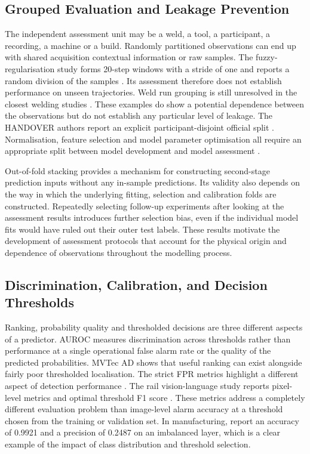 \subsection{Grouped Evaluation and Leakage Prevention}

The independent assessment unit may be a weld, a tool, a participant, a recording, a machine or a
build.
Randomly partitioned observations can end up with shared acquisition contextual information or raw
samples. The fuzzy-regularisation study forms 20-step windows with a stride of one and reports a random
division of the samples \parencite[Sections~IV.A--IV.B]{Altinses2023Fuzzy}.
Its assessment therefore does not establish performance on unseen trajectories.
Weld run grouping is still unresolved in the closest welding studies \parencite{P003,Hua2026Weld}. These
examples do show a potential dependence between the observations but do not establish any particular
level of leakage.
The HANDOVER authors report an explicit participant-disjoint official split \parencite{Thoduka2024Handover}.
Normalisation, feature selection and model parameter optimisation all require an appropriate split
between model development and model assessment \parencite{P004,P017}.

Out-of-fold stacking provides a mechanism for constructing second-stage prediction inputs without
any in-sample predictions. Its validity also depends on the way in which the
underlying fitting, selection and calibration folds are constructed.
Repeatedly selecting follow-up experiments after looking at the assessment results introduces
further selection bias, even if the individual model fits would have ruled out their outer test
labels.
These results motivate the development of assessment protocols that account for the physical origin
and dependence of observations throughout the modelling process.

\subsection{Discrimination, Calibration, and Decision Thresholds}

Ranking, probability quality and thresholded decisions are three different aspects of a predictor.
AUROC measures discrimination across thresholds rather than performance at a single operational
false alarm rate or the quality of the predicted probabilities.
MVTec AD shows that useful ranking can exist alongside fairly poor thresholded localisation. The
strict FPR metrics highlight a different aspect of detection performance
\parencite{Bergmann2019MVTec,Costanzino2024Multimodal,Cheng2025Multimodal}.
The rail vision-language study reports pixel-level metrics and optimal threshold F1 score \parencite[Section~IV.B.2]{P031}. These metrics address a completely different evaluation problem than image-level alarm
accuracy at a threshold chosen from the training or validation set.
In manufacturing, \textcite{Petrich2021Multimodal} report an accuracy of 0.9921 and a precision of 0.2487 on an
imbalanced layer, which is a clear example of the impact of class distribution and threshold
selection.


